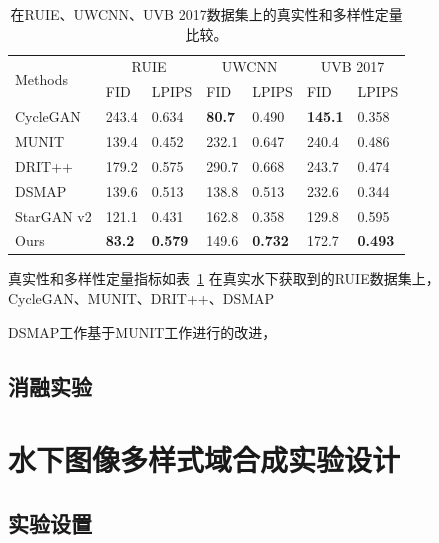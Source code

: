 \begin{table}[ht]
\centering
\caption{在RUIE、UWCNN、UVB 2017数据集上的真实性和多样性定量比较。}
\begin{tabular}{|p{2.5cm}|p{1.7cm}|p{1.7cm}|p{1.7cm}|p{1.7cm}|p{1.7cm}|p{1.7cm}|}
\hline
\multirow{2}{*}{Methods} & \multicolumn{2}{c|}{RUIE} & \multicolumn{2}{c|}{UWCNN} & \multicolumn{2}{c|}{UVB 2017} \\ \cline{2-7} 
                         & FID           & LPIPS       & FID           & LPIPS          & FID            & LPIPS          \\ \hline \hline
CycleGAN                 & 243.4         & 0.634       & \textbf{80.7} & 0.490          & \textbf{145.1} & 0.358          \\ \hline
MUNIT                    & 139.4         & 0.452       & 232.1         & 0.647          & 240.4          & 0.486          \\ \hline
DRIT++                   & 179.2         & 0.575       & 290.7         & 0.668          & 243.7          & 0.474          \\ \hline
DSMAP                    & 139.6         & 0.513       & 138.8         & 0.513          & 232.6          & 0.344          \\ \hline
StarGAN v2               & 121.1         & 0.431       & 162.8         & 0.358          & 129.8          & 0.595          \\ \hline
Ours                     & \textbf{83.2} & \textbf{0.579} & 149.6      & \textbf{0.732} & 172.7          & \textbf{0.493} \\ \hline
\end{tabular}
\label{tab:modal_compare}
\end{table}

真实性和多样性定量指标如表~\ref{tab:modal_compare}
在真实水下获取到的RUIE数据集上，CycleGAN、MUNIT、DRIT++、DSMAP

DSMAP工作基于MUNIT工作进行的改进，

\subsection{消融实验}

\section{水下图像多样式域合成实验设计}
\subsection{实验设置}

